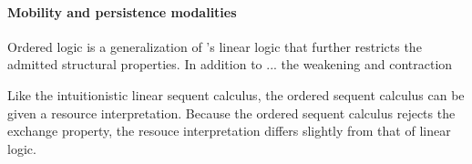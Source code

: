\begin{inferences}
  \infer[\rrule{\bot}]{\oseq{\octx |- \bot}}{
    \oseq{\octx |- \cdot}}
  \and
  \infer[\lrule{\bot}]{\oseq{\bot |- \cdot}}{}
\end{inferences}


\paragraph*{Mobility and persistence modalities}


\clearpage

Ordered logic is a generalization of \citeauthor{Girard:TCS?}'s linear logic\autocite{Girard:TCS?} that further restricts the admitted structural properties.
In addition to ... the weakening and contraction

Like the intuitionistic linear sequent calculus, the ordered sequent calculus can be given a resource interpretation.
Because the ordered sequent calculus rejects the exchange property, the resouce interpretation differs slightly from that of linear logic.

